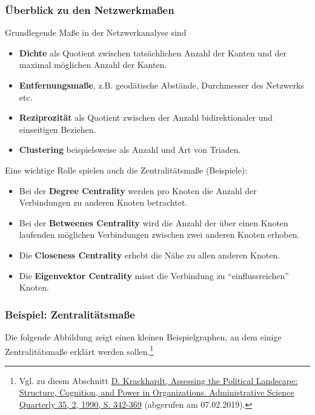 \documentclass[12pt,ngerman,]{article}
\providecommand{\tightlist}{%
  \setlength{\itemsep}{0pt}\setlength{\parskip}{0pt}}
\begin{document}
\subsubsection{Überblick zu den
Netzwerkmaßen}\label{uxfcberblick-zu-den-netzwerkmauxdfen}

Grundlegende Maße in der Netzwerkanalyse sind

\begin{itemize}
\tightlist
\item
  \textbf{Dichte} als Quotient zwischen tatsächlichen Anzahl der Kanten
  und der maximal möglichen Anzahl der Kanten.
\item
  \textbf{Entfernungsmaße}, z.B. geodätische Abstände, Durchmesser des
  Netzwerks etc.
\item
  \textbf{Reziprozität} als Quotient zwischen der Anzahl bidirektionaler
  und einseitigen Beziehen.
\item
  \textbf{Clustering} beispielsweise als Anzahl und Art von Triaden.
\end{itemize}

Eine wichtige Rolle spielen auch die Zentralitätsmaße (Beispiele):

\begin{itemize}
\tightlist
\item
  Bei der \textbf{Degree Centrality} werden pro Knoten die Anzahl der
  Verbindungen zu anderen Knoten betrachtet.
\item
  Bei der \textbf{Betweenes Centrality} wird die Anzahl der über einen
  Knoten laufenden möglichen Verbindungen zwischen zwei anderen Knoten
  erhoben.
\item
  Die \textbf{Closeness Centrality} erhebt die Nähe zu allen anderen
  Knoten.
\item
  Die \textbf{Eigenvektor Centrality} misst die Verbindung zu
  ``einflussreichen'' Knoten.
\end{itemize}

\subsubsection{Beispiel:
Zentralitätsmaße}\label{beispiel-zentralituxe4tsmauxdfe}

Die folgende Abbildung zeigt einen kleinen Beispielgraphen, an dem
einige Zentralitätsmaße erklärt werden sollen.\footnote{Vgl. zu diesm
  Abschnitt
  \href{https://www.jstor.org/stable/2393394?origin=crossref\&seq=1\#metadata_info_tab_contents}{D.
  Krackhardt, Assessing the Political Landscape: Structure, Cognition,
  and Power in Organizations. Administrative Science Quarterly 35, 2,
  1990, S. 342-369} (abgerufen am 07.02.2019).}
\end{document}

